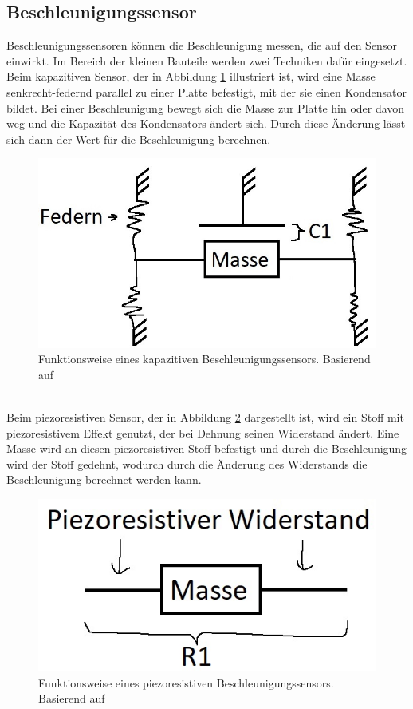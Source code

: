 \subsection{Beschleunigungssensor}
Beschleunigungssensoren können die Beschleunigung messen, die auf den Sensor einwirkt.
Im Bereich der kleinen Bauteile werden zwei Techniken dafür eingesetzt.\\
Beim kapazitiven Sensor, der in Abbildung \ref{fig:pic_accel_kapa} illustriert ist, wird eine Masse senkrecht-federnd parallel zu einer Platte befestigt, mit der sie einen Kondensator bildet.
Bei einer Beschleunigung bewegt sich die Masse zur Platte hin oder davon weg und die Kapazität des Kondensators ändert sich.
Durch diese Änderung lässt sich dann der Wert für die Beschleunigung berechnen. \cite{site_mems}
\begin{figure}[hbtp]
	\centering
	\includegraphics[width=0.33\linewidth]{res/kinAccel.jpg}
	\caption{Funktionsweise eines kapazitiven Beschleunigungssensors. Basierend auf \cite{site_sensorbild}}
	\label{fig:pic_accel_kapa}
\end{figure}\\
Beim piezoresistiven Sensor, der in Abbildung \ref{fig:pic_accel_pie} dargestellt ist, wird ein Stoff mit piezoresistivem Effekt genutzt, der bei Dehnung seinen Widerstand ändert.
Eine Masse wird an diesen piezoresistiven Stoff befestigt und durch die Beschleunigung wird der Stoff gedehnt, wodurch durch die Änderung des Widerstands die Beschleunigung berechnet werden kann. \cite{site_dms}
\begin{figure}[hbtp]
	\centering
	\includegraphics[width=0.25\linewidth]{res/prAccel.jpg}
	\caption{Funktionsweise eines piezoresistiven Beschleunigungssensors. Basierend auf \cite{site_sensorbild}}
	\label{fig:pic_accel_pie}
\end{figure}

